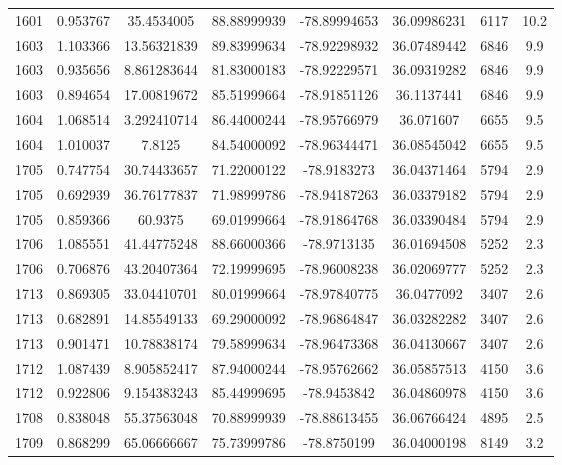 \documentclass[11pt]{article}
\begin{document}
\begin{longtable*}{|c|c|c|c|c|c|c|c|}
1601  & 0.953767       & 35.4534005        & 88.88999939    & -78.89994653 & 36.09986231 & 6117       & 10.2 \\
1603  & 1.103366       & 13.56321839       & 89.83999634    & -78.92298932 & 36.07489442 & 6846       & 9.9  \\
1603  & 0.935656       & 8.861283644       & 81.83000183    & -78.92229571 & 36.09319282 & 6846       & 9.9  \\
1603  & 0.894654       & 17.00819672       & 85.51999664    & -78.91851126 & 36.1137441  & 6846       & 9.9  \\
1604  & 1.068514       & 3.292410714       & 86.44000244    & -78.95766979 & 36.071607   & 6655       & 9.5  \\
1604  & 1.010037       & 7.8125            & 84.54000092    & -78.96344471 & 36.08545042 & 6655       & 9.5  \\
1705  & 0.747754       & 30.74433657       & 71.22000122    & -78.9183273  & 36.04371464 & 5794       & 2.9  \\
1705  & 0.692939       & 36.76177837       & 71.98999786    & -78.94187263 & 36.03379182 & 5794       & 2.9  \\
1705  & 0.859366       & 60.9375           & 69.01999664    & -78.91864768 & 36.03390484 & 5794       & 2.9  \\
1706  & 1.085551       & 41.44775248       & 88.66000366    & -78.9713135  & 36.01694508 & 5252       & 2.3  \\
1706  & 0.706876       & 43.20407364       & 72.19999695    & -78.96008238 & 36.02069777 & 5252       & 2.3  \\
1713  & 0.869305       & 33.04410701       & 80.01999664    & -78.97840775 & 36.0477092  & 3407       & 2.6  \\
1713  & 0.682891       & 14.85549133       & 69.29000092    & -78.96864847 & 36.03282282 & 3407       & 2.6  \\
1713  & 0.901471       & 10.78838174       & 79.58999634    & -78.96473368 & 36.04130667 & 3407       & 2.6  \\
1712  & 1.087439       & 8.905852417       & 87.94000244    & -78.95762662 & 36.05857513 & 4150       & 3.6  \\
1712  & 0.922806       & 9.154383243       & 85.44999695    & -78.9453842  & 36.04860978 & 4150       & 3.6  \\
1708  & 0.838048       & 55.37563048       & 70.88999939    & -78.88613455 & 36.06766424 & 4895       & 2.5  \\
1709  & 0.868299       & 65.06666667       & 75.73999786    & -78.8750199  & 36.04000198 & 8149       & 3.2  \\

\end{longtable*}
\end{document}
